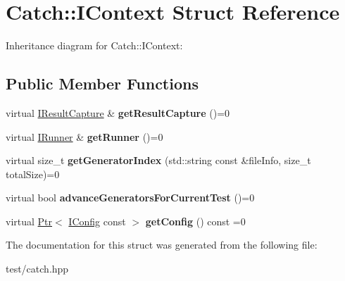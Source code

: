 \hypertarget{structCatch_1_1IContext}{}\section{Catch\+:\+:I\+Context Struct Reference}
\label{structCatch_1_1IContext}


Inheritance diagram for Catch\+:\+:I\+Context\+:
\subsection*{Public Member Functions}
\begin{DoxyCompactItemize}
\item 
virtual \hyperlink{structCatch_1_1IResultCapture}{I\+Result\+Capture} \& {\bfseries get\+Result\+Capture} ()=0\hypertarget{structCatch_1_1IContext_a7df92cdf3d2600866bf5aeb56c236cf9}{}\label{structCatch_1_1IContext_a7df92cdf3d2600866bf5aeb56c236cf9}

\item 
virtual \hyperlink{structCatch_1_1IRunner}{I\+Runner} \& {\bfseries get\+Runner} ()=0\hypertarget{structCatch_1_1IContext_a8106d887b354016f3d79449731b459b9}{}\label{structCatch_1_1IContext_a8106d887b354016f3d79449731b459b9}

\item 
virtual size\+\_\+t {\bfseries get\+Generator\+Index} (std\+::string const \&file\+Info, size\+\_\+t total\+Size)=0\hypertarget{structCatch_1_1IContext_a43e07088db43299ba129fbe6d3106e95}{}\label{structCatch_1_1IContext_a43e07088db43299ba129fbe6d3106e95}

\item 
virtual bool {\bfseries advance\+Generators\+For\+Current\+Test} ()=0\hypertarget{structCatch_1_1IContext_a806f7c4ed24d51adae90418e661b24b7}{}\label{structCatch_1_1IContext_a806f7c4ed24d51adae90418e661b24b7}

\item 
virtual \hyperlink{classCatch_1_1Ptr}{Ptr}$<$ \hyperlink{structCatch_1_1IConfig}{I\+Config} const  $>$ {\bfseries get\+Config} () const =0\hypertarget{structCatch_1_1IContext_aee81c415899262e096ad8d6f686fa365}{}\label{structCatch_1_1IContext_aee81c415899262e096ad8d6f686fa365}

\end{DoxyCompactItemize}


The documentation for this struct was generated from the following file\+:\begin{DoxyCompactItemize}
\item 
test/catch.\+hpp\end{DoxyCompactItemize}
